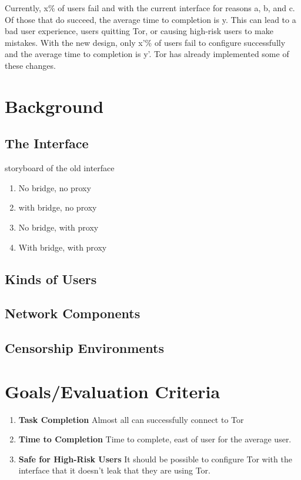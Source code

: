 \documentclass{template}
\begin{document}
Currently, x\% of users fail and with the current interface for reasons a, b, and c. Of those that do succeed, the average time to completion is y. This can lead to a bad user experience, users quitting Tor, or causing high-risk users to make mistakes. With the new design, only x'\% of users fail to configure successfully and the average time to completion is y'. Tor has already implemented some of these changes. 

\section{Background} 
\subsection{The Interface} 
{\color {red} storyboard of the old interface 

\begin{enumerate} \itemsep1pt \parskip0pt 
    \item No bridge, no proxy
    \item with bridge, no proxy
    \item No bridge, with proxy
    \item With bridge, with proxy
\end{enumerate}
}
\subsection{Kinds of Users} 
\subsection{Network Components} 
\subsection{Censorship Environments} 

\section{Goals/Evaluation Criteria} 
\begin{enumerate} \itemsep1pt \parskip0pt 
    \item {\bfseries Task Completion} Almost all can successfully connect to Tor
    \item {\bfseries Time to Completion} Time to complete, east of user for the average user. 
    \item {\bfseries Safe for High-Risk Users} It should be possible to configure Tor with the interface that it doesn't leak that they are using Tor. 
\end{enumerate}
\end{document}
